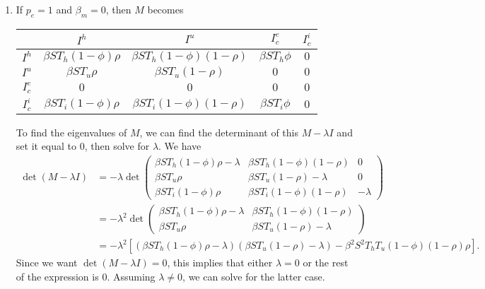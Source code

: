 \documentclass[10pt]{article}
\begin{document}
\begin{enumerate}
	\item 
		If $p_e = 1$ and $\beta_m = 0$, then $M$ becomes
		\begin{table}[H]
			\centering
			\begin{tabular}{c|c|c|c|c}
			&  $I^h$ & $I^u$ & $I_{c}^e$ & $I_{c}^i$ \\
                                \hline
                                $I^h$ & $\beta S T_h (1-\phi) \rho$ & $\beta S T_h (1-\phi) (1-\rho)$ & $\beta S T_h \phi$ & $0$ \\
                                \hline 
                                $I^u$ & $\beta S T_u \rho$ & $\beta S T_u (1-\rho)$ & $0$ & $0$ \\
                                \hline
				$I_{c}^e$ & $0$ & $0$ & $0$ & $0$ \\
                                \hline
				$I_{c}^i$ & $\beta S T_i (1-\phi) \rho$ & $\beta S T_i (1-\phi) (1-\rho)$ & $\beta S T_i \phi$ & $0$
			\end{tabular}
		\end{table}
		To find the eigenvalues of $M$, we can find the determinant of this $M-\lambda I$ and set it equal to $0$, then solve for $\lambda$. We have
		\begin{align*}
			\det(M-\lambda I) &= -\lambda \det
			\begin{pmatrix}
				\beta S T_h (1-\phi) \rho - \lambda & \beta S T_h (1-\phi) (1-\rho) & 0 \\
				\beta S T_u \rho & \beta S T_u (1-\rho) -\lambda & 0 \\
				\beta S T_i (1-\phi) \rho & \beta S T_i (1-\phi) (1-\rho) & -\lambda
			\end{pmatrix} \\
				  &= -\lambda^2 \det
			  \begin{pmatrix}
				\beta S T_h (1-\phi) \rho - \lambda & \beta S T_h (1-\phi) (1-\rho) \\
				\beta S T_u \rho & \beta S T_u (1-\rho) -\lambda
			  \end{pmatrix} \\
				  &= -\lambda^2 \left[ \left( \beta S T_h (1-\phi) \rho -\lambda \right) \left( \beta S T_u (1-\rho) - \lambda \right) - \beta^2 S^2 T_h T_u (1-\phi) (1-\rho) \rho \right].
		\end{align*}
		Since we want $\det(M-\lambda I) = 0$, this implies that either $\lambda = 0$ or the rest of the expression is $0$. Assuming $\lambda \neq 0$, we can solve for the latter case.
		\begin{align*}

\end{align*}
\end{enumerate}
\end{document}
